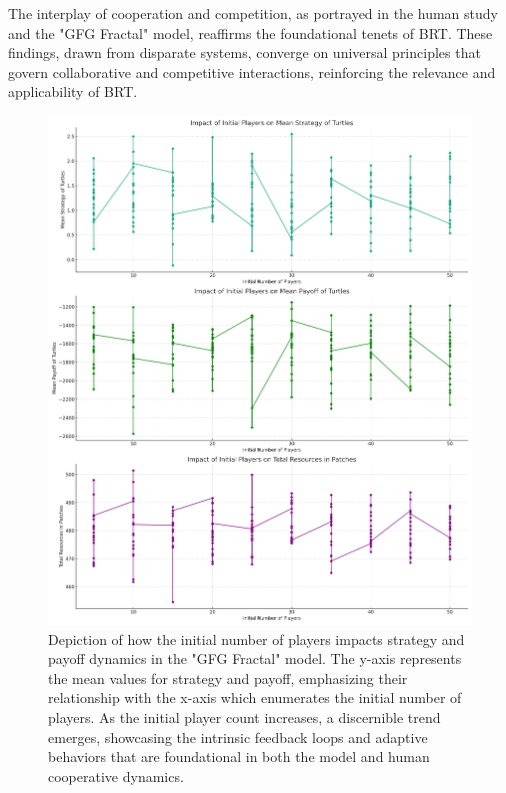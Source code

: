 \documentclass[sn-nature]{sn-jnl}%
\theoremstyle{thmstyleone}%
\theoremstyle{thmstyletwo}%
\theoremstyle{thmstylethree}%
\begin{document}
The interplay of cooperation and competition, as portrayed in the human study and the "GFG Fractal" model, reaffirms the foundational tenets of BRT. These findings, drawn from disparate systems, converge on universal principles that govern collaborative and competitive interactions, reinforcing the relevance and applicability of BRT.
\begin{figure}[H]
    \centering
    \includegraphics[width=1\linewidth]{initial_players_impact.png}
    \caption[GFG Fractal Strategy and Payoff Factors]{Depiction of how the initial number of players impacts strategy and payoff dynamics in the "GFG Fractal" model. The y-axis represents the mean values for strategy and payoff, emphasizing their relationship with the x-axis which enumerates the initial number of players. As the initial player count increases, a discernible trend emerges, showcasing the intrinsic feedback loops and adaptive behaviors that are foundational in both the model and human cooperative dynamics.}

    \label{fig:numberplayers}
\end{figure}
\end{document}
